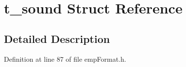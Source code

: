 \hypertarget{structt__sound}{}\section{t\+\_\+sound Struct Reference}
\label{structt__sound}


\subsection{Detailed Description}


Definition at line 87 of file emp\+Format.\+h.

